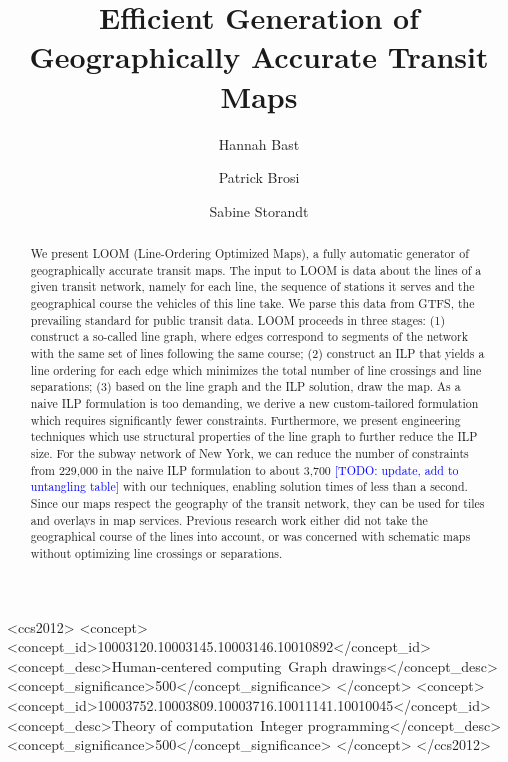 \documentclass[format=acmsmall, review=false, screen=true]{acmart}
\newcommand\TODO[1]{\textcolor{blue}{\small [TODO: #1]}}
\begin{document}
\title{Efficient Generation of Geographically Accurate Transit Maps}

\author{Hannah Bast}

\author{Patrick Brosi}

\author{Sabine Storandt}

\begin{abstract}
We present LOOM (Line-Ordering Optimized Maps), a fully automatic generator of geographically accurate transit maps.
The input to LOOM is data about the lines of a given transit network, namely for each line, the sequence of stations it serves and the geographical course the vehicles of this line take. We parse this data from GTFS, the prevailing standard for public transit data.
LOOM proceeds in three stages:
	(1) construct a so-called line graph, where edges correspond to segments of the network with the same set of lines following the same course;
	(2) construct an ILP that yields a line ordering for each edge which minimizes the total number of line crossings and line separations;
	(3) based on the line graph and the ILP solution, draw the map.
As a naive ILP formulation is too demanding, we derive a new custom-tailored formulation which requires significantly fewer constraints. Furthermore, we present engineering techniques which use structural properties of the line graph to further reduce the ILP size. For the subway network of New York, we can reduce the number of constraints from 229,000 in the naive ILP formulation to about 3,700 \TODO{update, add to untangling table} with our techniques, enabling solution times of less than a second. Since our maps respect the geography of the transit network, they can be used for tiles and overlays in map services. Previous research work either did not take the geographical course of the lines into account, or was concerned with schematic maps without optimizing line crossings or separations.
\end{abstract}

\def\UrlFont{\normalsize}

%
%
\begin{CCSXML}
<ccs2012>
<concept>
<concept_id>10003120.10003145.10003146.10010892</concept_id>
<concept_desc>Human-centered computing~Graph drawings</concept_desc>
<concept_significance>500</concept_significance>
</concept>
<concept>
<concept_id>10003752.10003809.10003716.10011141.10010045</concept_id>
<concept_desc>Theory of computation~Integer programming</concept_desc>
<concept_significance>500</concept_significance>
</concept>
</ccs2012>
\end{CCSXML}
\end{document}
